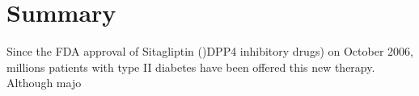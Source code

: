 \section{\label{chap:Sum} Summary}
Since the FDA approval of Sitagliptin ()DPP4 inhibitory drugs) on October 2006, millions patients with type II diabetes have been offered this new therapy. Although majo
